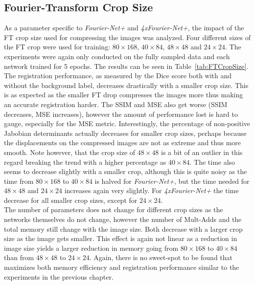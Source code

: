 \documentclass[english,version-2022-01]{uzl-thesis} %
\begin{document}
\subsection{Fourier-Transform Crop Size} \label{SubSec:ResultsFTCropSize}
As a parameter specific to \emph{Fourier-Net+} and \emph{4xFourier-Net+}, the impact of the FT crop size used for compressing the images was analyzed. Four different sizes of the FT crop were used for training: $80 \times 168$, $40 \times 84$, $48 \times 48$ and $24 \times 24$. The experiments were again only conducted on the fully sampled data and each network trained for 5 epochs. The results can be seen in Table~\ref{tab:FTCropSize}. \\
The registration performance, as measured by the Dice score both with and without the background label, decreases drastically with a smaller crop size. This is as expected as the smaller FT drop compresses the images more thus making an accurate registration harder. The SSIM and MSE also get worse (SSIM decreases, MSE increases), however the amount of performance lost is hard to gauge, especially for the MSE metric. Interestingly, the percentage of non-positive Jabobian determinants actually decreases for smaller crop sizes, perhaps because the displacements on the compressed images are not as extreme and thus more smooth. Note however, that the crop size of $48 \times 48$ is a bit of an outlier in this regard breaking the trend with a higher percentage as $40 \times 84$. The time also seems to decrease slightly with a smaller crop, although this is quite noisy as the time from $80 \times 168$ to $40 \times 84$ is halved for \emph{Fourier-Net+}, but the time needed for $48 \times 48$ and $24 \times 24$ increases again very slightly. For \emph{4xFourier-Net+} the time decrease for all smaller crop sizes, except for $24 \times 24$.\\
The number of parameters does not change for different crop sizes as the networks themselves do not change, however the number of Mult-Adds and the total memory still change with the image size. Both decrease with a larger crop size as the image gets smaller. This effect is again not linear as a reduction in image size yields a larger reduction in memory going from $80 \times 168$ to $40 \times 84$ than from $48 \times 48$ to $24 \times 24$. Again, there is no sweet-spot to be found that maximizes both memory efficiency and registration performance similar to the experiments in the previous chapter.
\end{document}
